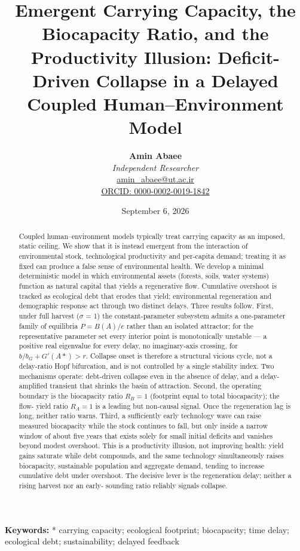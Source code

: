\documentclass[11pt]{article}
\title{Emergent Carrying Capacity, the Biocapacity Ratio, and the Productivity Illusion: Deficit-Driven Collapse in a Delayed Coupled Human–Environment Model}
\author{
  \textbf{Amin Abaee}\\
  \textit{Independent Researcher}\\
  \href{mailto:amin_abaee@ut.ac.ir}{amin\_abaee@ut.ac.ir}\\
  \href{https://orcid.org/0000-0002-0019-1842}{ORCID: 0000-0002-0019-1842}
}
\date{September 6, 2026}
\begin{document}
\maketitle

\begin{abstract}
Coupled human–environment models typically treat carrying capacity as an imposed, static ceiling. We show that it is instead emergent from the interaction of environmental stock, technological productivity and per-capita demand; treating it as fixed can produce a false sense of environmental health. We develop a minimal deterministic model in which environmental assets (forests, soils, water systems) function as natural capital that yields a regenerative flow. Cumulative overshoot is tracked as ecological debt that erodes that yield; environmental regeneration and demographic response act through two distinct delays. Three results follow. First, under full harvest (\ensuremath{\sigma{}} = 1) the constant-parameter subsystem admits a one-parameter family of equilibria $P = B(A)/e$ rather than an isolated attractor; for the representative parameter set every interior point is monotonically unstable — a positive real eigenvalue for every delay, no imaginary-axis crossing, for $b/b_{G} + G\prime{}(A*) > r$. Collapse onset is therefore a structural vicious cycle, not a delay-ratio Hopf bifurcation, and is not controlled by a single stability index. Two mechanisms operate: debt-driven collapse even in the absence of delay, and a delay-amplified transient that shrinks the basin of attraction. Second, the operating boundary is the biocapacity ratio $R_{B} = 1$ (footprint equal to total biocapacity); the flow- yield ratio $R_{A} = 1$ is a leading but non-causal signal. Once the regeneration lag is long, neither ratio warns. Third, a sufficiently early technology wave can raise measured biocapacity while the stock continues to fall, but only inside a narrow window of about five years that exists solely for small initial deficits and vanishes beyond modest overshoot. This is a productivity illusion, not improving health: yield gains saturate while debt compounds, and the same technology simultaneously raises biocapacity, sustainable population and aggregate demand, tending to increase cumulative debt under overshoot. The decisive lever is the regeneration delay; neither a rising harvest nor an early- sounding ratio reliably signals collapse.
\end{abstract}

\noindent\textbf{Keywords: }* carrying capacity; ecological footprint; biocapacity; time delay; ecological debt; sustainability; delayed feedback
\end{document}
